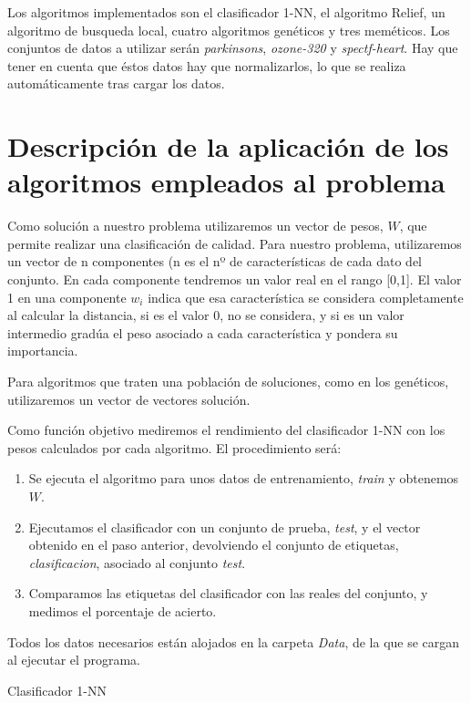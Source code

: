 \documentclass[14pt]{article}
\newcommand\tab[1][1cm]{\hspace*{#1}}
\begin{document}
	Los algoritmos implementados son el clasificador 1-NN, el algoritmo Relief, un algoritmo de busqueda local, cuatro algoritmos genéticos y tres meméticos. Los conjuntos de datos a utilizar serán \textit{parkinsons},  \textit{ozone-320} y \textit{spectf-heart}. Hay que tener en cuenta que éstos datos hay que normalizarlos, lo que se realiza automáticamente tras cargar los datos.
	
\newpage
\section{Descripción de la aplicación de los algoritmos empleados al problema}
\tab Como solución a nuestro problema utilizaremos un vector de pesos, $W$, que permite realizar una clasificación de calidad. Para nuestro problema, utilizaremos un vector de n componentes (n es el nº de características de cada dato del conjunto. En cada componente tendremos un valor real en el rango [0,1]. El valor 1 en una componente $w_{i}$ indica que esa característica se considera completamente al calcular la distancia, si es el valor 0, no se considera, y si es un valor intermedio gradúa el peso asociado a cada característica y pondera su importancia.

\tab Para algoritmos que traten una población de soluciones, como en los genéticos, utilizaremos un vector de vectores solución. 

\tab Como función objetivo mediremos el rendimiento del clasificador 1-NN con los pesos calculados por cada algoritmo. El procedimiento será:

\begin{enumerate}
\item Se ejecuta el algoritmo para unos datos de entrenamiento, \textit{train} y obtenemos $W$.
\item Ejecutamos el clasificador con un conjunto de prueba, \textit{test}, y el vector obtenido en el paso anterior, devolviendo el conjunto de etiquetas, \textit{clasificacion}, asociado al conjunto \textit{test}.
\item Comparamos las etiquetas del clasificador con las reales del conjunto, y medimos el porcentaje de acierto.
\end{enumerate}
\tab Todos los datos necesarios están alojados en la carpeta \textit{Data}, de la que se cargan al ejecutar el programa.

\begin{algorithm}
	\begin{algorithmic}[1]
	\label{lin:lineaRara}
	\EndFor
	\end{algorithmic}
	\caption{Clasificador 1-NN}
\end{algorithm}
\end{document}
